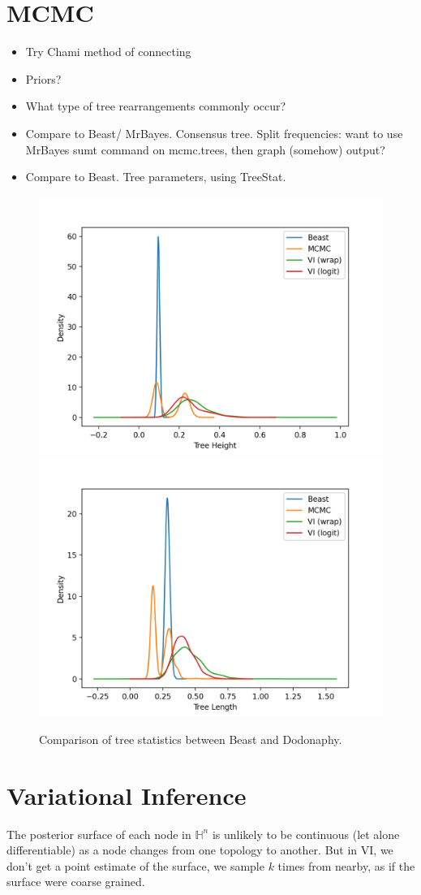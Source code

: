 \documentclass[11pt]{article}
\begin{document}
\section{MCMC}

\begin{itemize}
\item Try Chami method of connecting
\item Priors?
\item What type of tree rearrangements commonly occur?
\item Compare to Beast/ MrBayes. Consensus tree. Split frequencies: want to use MrBayes sumt command on mcmc.trees, then graph (somehow) output?
\item Compare to Beast. Tree parameters, using TreeStat. 
\end{itemize}

\begin{figure}[htbp]
\begin{center}
\includegraphics[width=.5\linewidth]{fig/tree_height}%
\includegraphics[width=.5\linewidth]{fig/tree_length}
\caption{Comparison of tree statistics between Beast and Dodonaphy.}
\label{fig:mcmc_cmp}
\end{center}
\end{figure}


\section{Variational Inference}
The posterior surface of each node in $\mathbb{H}^{n}$ is unlikely to be continuous (let alone differentiable) as a node changes from one topology to another. But in VI, we don't get a point estimate of the surface, we sample $k$ times from nearby, as if the surface were coarse grained.
\end{document}
